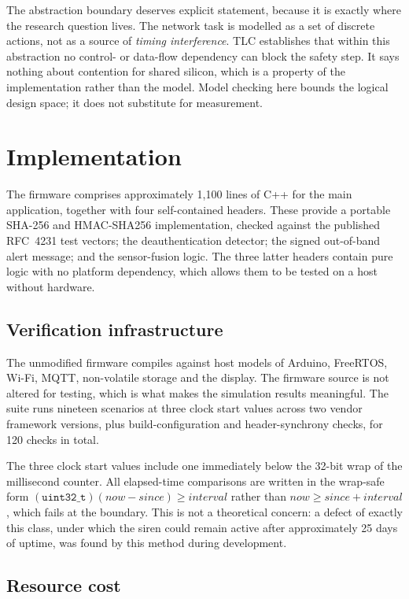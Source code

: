 The abstraction boundary deserves explicit statement, because it is exactly where the research
question lives. The network task is modelled as a set of discrete actions, not as a source of
\emph{timing interference}. TLC establishes that within this abstraction no control- or data-flow
dependency can block the safety step. It says nothing about contention for shared silicon, which
is a property of the implementation rather than the model. Model checking here bounds the logical
design space; it does not substitute for measurement.

\section{Implementation}\label{sec:impl}

The firmware comprises approximately 1{,}100 lines of C++ for the main application, together
with four self-contained headers. These provide a portable SHA-256 and HMAC-SHA256
implementation, checked against the published RFC~4231 test vectors; the deauthentication
detector; the signed out-of-band alert message; and the sensor-fusion logic. The three latter headers contain pure logic with no platform
dependency, which allows them to be tested on a host without hardware.

\subsection{Verification infrastructure}

The unmodified firmware compiles against host models of Arduino, FreeRTOS, Wi-Fi, MQTT,
non-volatile storage and the display. The firmware source is not altered for testing, which is
what makes the simulation results meaningful. The suite runs nineteen scenarios at three clock
start values across two vendor framework versions, plus build-configuration and header-synchrony
checks, for 120 checks in total.

The three clock start values include one immediately below the 32-bit wrap of the millisecond
counter. All elapsed-time comparisons are written in the wrap-safe form
$(\texttt{uint32\_t})(\mathit{now} - \mathit{since}) \ge \mathit{interval}$ rather than
$\mathit{now} \ge \mathit{since} + \mathit{interval}$, which fails at the boundary. This is not a
theoretical concern: a defect of exactly this class, under which the siren could remain active
after approximately 25 days of uptime, was found by this method during development.

\subsection{Resource cost}

